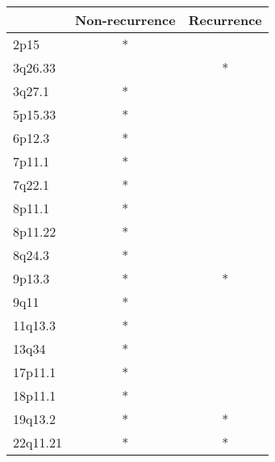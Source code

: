 \begin{tabular}{lcc}
\toprule
{} & Non-recurrence & Recurrence \\
\midrule
2p15     &              * &            \\
3q26.33  &                &          * \\
3q27.1   &              * &            \\
5p15.33  &              * &            \\
6p12.3   &              * &            \\
7p11.1   &              * &            \\
7q22.1   &              * &            \\
8p11.1   &              * &            \\
8p11.22  &              * &            \\
8q24.3   &              * &            \\
9p13.3   &              * &          * \\
9q11     &              * &            \\
11q13.3  &              * &            \\
13q34    &              * &            \\
17p11.1  &              * &            \\
18p11.1  &              * &            \\
19q13.2  &              * &          * \\
22q11.21 &              * &          * \\
\bottomrule
\end{tabular}
